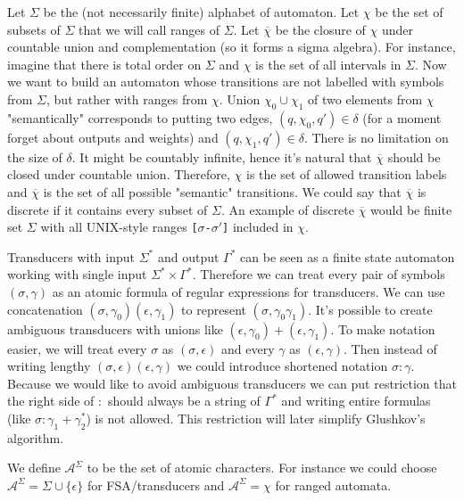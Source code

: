 Let $\Sigma$ be the (not necessarily finite) alphabet of automaton. Let $\chi$ be the set of subsets of $\Sigma$ that we will call ranges of $\Sigma$. Let  $\overline{\chi}$ be  the closure of $\chi$ under countable union and complementation (so it forms a sigma algebra). For instance, imagine that there is total order on $\Sigma$ and  $\chi$ is the set of all intervals in $\Sigma$. Now we want to build an automaton whose transitions are not labelled with symbols from $\Sigma$, but rather with ranges from $\chi$. Union $\chi_0\cup\chi_1$ of two elements from $\chi$ "semantically" corresponds to putting two edges, $(q,\chi_0,q')\in\delta$ (for a moment forget about outputs and weights) and $(q,\chi_1,q')\in\delta$. There is no limitation on the size of $\delta$. It might be countably infinite, hence it's natural that $\overline{\chi}$ should be closed under countable union. Therefore, $\chi$ is the set of allowed transition labels and $\overline{\chi}$ is the set of all possible "semantic" transitions. We could say that $\overline{\chi}$ is discrete if it contains every subset of $\Sigma$. An example of discrete $\overline{\chi}$ would be finite set $\Sigma$ with all UNIX-style ranges \texttt{[$\sigma$-$\sigma'$]} included in $\chi$. 

Transducers with input $\Sigma^*$ and output $\Gamma^*$ can be seen as a finite state automaton working with single input $\Sigma^* \times \Gamma^*$. Therefore we can treat every pair of symbols $(\sigma,\gamma)$ as an atomic formula of regular expressions for transducers. We can use concatenation $(\sigma,\gamma_0)(\epsilon,\gamma_1)$ to represent $(\sigma,\gamma_0\gamma_1)$. It's possible to create ambiguous transducers with unions like  $(\epsilon,\gamma_0)+(\epsilon,\gamma_1)$.  To make notation easier, we will treat every $\sigma$ as $(\sigma,\epsilon)$ and every $\gamma$ as $(\epsilon,\gamma)$. Then instead of writing lengthy $(\sigma,\epsilon)(\epsilon,\gamma)$ we could introduce shortened notation $\sigma:\gamma$. Because we would like to avoid ambiguous transducers we can put restriction that the right side of $:$ should always be a string of $\Gamma^*$ and writing entire formulas (like $\sigma:\gamma_1+\gamma_2^*$) is not allowed. This restriction will later simplify Glushkov's algorithm. 

We define $\mathcal{A}^\Sigma$ to be the set of atomic characters. For instance we could choose $\mathcal{A}^\Sigma=\Sigma\cup\{\epsilon\}$ for FSA/transducers and $\mathcal{A}^\Sigma=\chi$ for ranged automata. 

